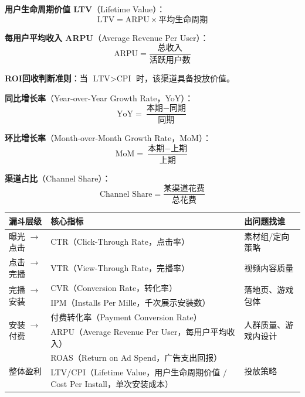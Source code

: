 \begin{definition}[用户价值类指标]

\textbf{用户生命周期价值 LTV}（Lifetime Value）：
$$\text{LTV} = \text{ARPU} \times \text{平均生命周期}$$

\textbf{每用户平均收入 ARPU}（Average Revenue Per User）：
$$\text{ARPU} = \frac{\text{总收入}}{\text{活跃用户数}}$$

\textbf{ROI回收判断准则}：当 $\text{LTV} > \text{CPI}$ 时，该渠道具备投放价值。

\end{definition}

\begin{definition}[效果对比类指标]

\textbf{同比增长率}（Year-over-Year Growth Rate，YoY）：
$$\text{YoY} = \frac{\text{本期} - \text{同期}}{\text{同期}}$$

\textbf{环比增长率}（Month-over-Month Growth Rate，MoM）：
$$\text{MoM} = \frac{\text{本期} - \text{上期}}{\text{上期}}$$

\textbf{渠道占比}（Channel Share）：
$$\text{Channel Share} = \frac{\text{某渠道花费}}{\text{总花费}}$$

\end{definition}

\begin{note}[广告投放漏斗归因一览]

\begin{table}[h]
\centering
\begin{tabular}{lll}
\hline
\textbf{漏斗层级} & \textbf{核心指标} & \textbf{出问题找谁} \\
\hline
曝光 $\to$ 点击 & CTR（Click-Through Rate，点击率） & 素材组/定向策略 \\
点击 $\to$ 完播 & VTR（View-Through Rate，完播率） & 视频内容质量 \\
\multirow{2}{*}{完播 $\to$ 安装} & CVR（Conversion Rate，转化率） & \multirow{2}{*}{落地页、游戏包体} \\
 & IPM（Installs Per Mille，千次展示安装数） & \\
\multirow{2}{*}{安装 $\to$ 付费} & 付费转化率（Payment Conversion Rate） & \multirow{2}{*}{人群质量、游戏内设计} \\
 & ARPU（Average Revenue Per User，每用户平均收入） & \\
\multirow{2}{*}{整体盈利} & ROAS（Return on Ad Spend，广告支出回报） & \multirow{2}{*}{投放策略} \\
 & LTV/CPI（Lifetime Value，用户生命周期价值 / Cost Per Install，单次安装成本） & \\
\hline
\end{tabular}
\end{table}

\end{note}

